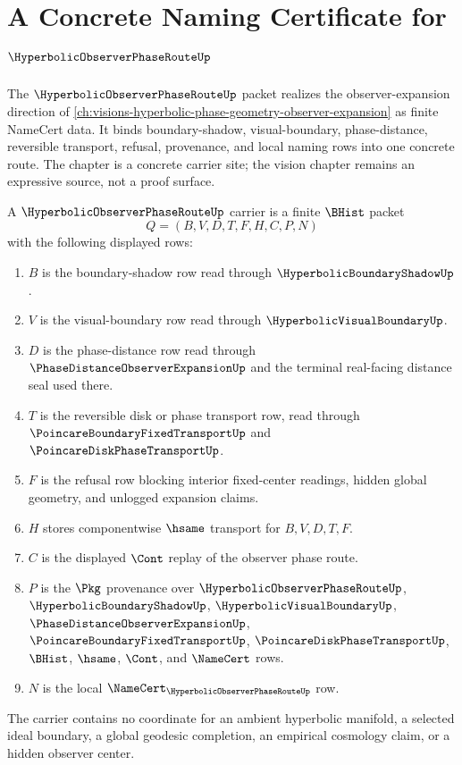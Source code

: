 \chapter{A Concrete Naming Certificate for $\HyperbolicObserverPhaseRouteUp$}
\label{ch:concrete-instances-hyperbolic-observer-phase-route-namecert}

The $\HyperbolicObserverPhaseRouteUp$ packet realizes the observer-expansion direction of \autoref{ch:visions-hyperbolic-phase-geometry-observer-expansion} as finite NameCert data. It binds boundary-shadow, visual-boundary, phase-distance, reversible transport, refusal, provenance, and local naming rows into one concrete route. The chapter is a concrete carrier site; the vision chapter remains an expressive source, not a proof surface.

\begin{definition}
\label{def:hyperbolic-observer-phase-route-carrier}
A $\HyperbolicObserverPhaseRouteUp$ carrier is a finite $\BHist$ packet
$$
Q=(B,V,D,T,F,H,C,P,N)
$$
with the following displayed rows:
\begin{enumerate}
\item $B$ is the boundary-shadow row read through $\HyperbolicBoundaryShadowUp$.
\item $V$ is the visual-boundary row read through $\HyperbolicVisualBoundaryUp$.
\item $D$ is the phase-distance row read through $\PhaseDistanceObserverExpansionUp$ and the terminal real-facing distance seal used there.
\item $T$ is the reversible disk or phase transport row, read through $\PoincareBoundaryFixedTransportUp$ and $\PoincareDiskPhaseTransportUp$.
\item $F$ is the refusal row blocking interior fixed-center readings, hidden global geometry, and unlogged expansion claims.
\item $H$ stores componentwise $\hsame$ transport for $B,V,D,T,F$.
\item $C$ is the displayed $\Cont$ replay of the observer phase route.
\item $P$ is the $\Pkg$ provenance over $\HyperbolicObserverPhaseRouteUp$, $\HyperbolicBoundaryShadowUp$, $\HyperbolicVisualBoundaryUp$, $\PhaseDistanceObserverExpansionUp$, $\PoincareBoundaryFixedTransportUp$, $\PoincareDiskPhaseTransportUp$, $\BHist$, $\hsame$, $\Cont$, and $\NameCert$ rows.
\item $N$ is the local $\NameCert_{\HyperbolicObserverPhaseRouteUp}$ row.
\end{enumerate}
The carrier contains no coordinate for an ambient hyperbolic manifold, a selected ideal boundary, a global geodesic completion, an empirical cosmology claim, or a hidden observer center.
\end{definition}

